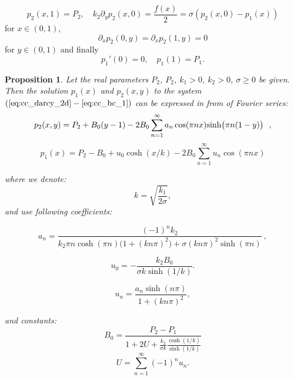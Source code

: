 \documentclass{elsarticle}
\newtheorem{prop}{Proposition}
\def\prtl{\partial} %
\begin{document}
\begin{equation}
    \label{eq:cc_bc_x}
    p_2(x, 1) = P_2, \quad
    k_2\prtl_y p_2(x,0) = \frac{f(x)}{2}
                        = \sigma(p_2(x,0) - p_1(x))
\end{equation}
for  $x\in (0,1)$,
\begin{equation}
    \label{eq:cc_bc_y}
    \prtl_x p_2(0,y) = \prtl_x p_2(1,y) = 0    
\end{equation}
for $y \in (0, 1)$ and finally
\begin{equation}
    \label{eq:cc_bc_1}
    p_1'(0) = 0, \quad  p_1(1) = P_1. 
\end{equation}

\begin{prop}
\label{proposition_continuous}
Let the real parameters $P_2$, $P_2$, $k_1>0$, $k_2>0$, $\sigma\ge0$ be given. Then the solution $p_1(x)$ and $p_2(x,y)$ to the system 
$(\ref{eq:cc_darcy_2d} - \ref{eq:cc_bc_1})$ can be expressed in from of Fourier series:
\begin{equation}
    \label{eq:p2_series}
    p_2(x,y) = P_2 + B_0(y-1) -2B_0 \sum_{n=1}^\infty a_n \cos(\pi n x) {\rm sinh} \big(\pi n(1-y)\big)  \ \ ,
\end{equation}
%
\begin{equation}
    \label{eq:p1_series}
    p_1(x) = P_2-B_0 +u_0 \cosh(x/k) -2B_0 \sum_{n=1}^\infty  u_n \cos(\pi n x) 
\end{equation}

where we denote:
\[
    k = \sqrt{\frac{k_1}{2\sigma}}, 
\]    
and use following coefficients:

\begin{equation}
    \label{eq:an}
    a_n = \frac{(-1)^n k_2}{ k_2 \pi n \cosh(\pi n) \big(1 + (k n \pi)^2\big) 
    + \sigma (k n \pi)^2 \sinh(\pi n)} \ , 
\end{equation}

\begin{equation}
    \label{eq:u0}
    u_0 = -\frac{k_2 B_0}{\sigma k\sinh(1/k)}.
\end{equation}

\begin{equation}
    \label{eq:un}
    u_n = \frac{a_n \sinh(n \pi)}{1 + (k n \pi)^2}, 
\end{equation}

and constants:
\begin{equation}
     \label{eq:b0}
     B_0 = \frac{P_2 - P_1}{1 + 2  U + \frac{k_2}{\sigma k} \frac{\cosh(1/k)}{\sinh(1/k)}} 
\end{equation}
\begin{equation}
    \label{eq:U}
    U =  \sum_{n=1}^{\infty} (-1)^n u_n.
\end{equation}

\end{prop}
\end{document}
